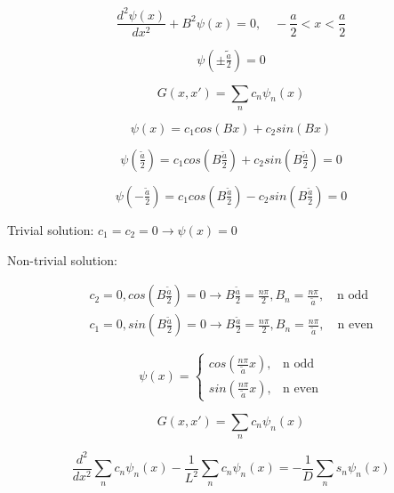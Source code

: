 \documentclass[12pt]{article}
\begin{document}
\begin{equation*}
\frac{d^2\psi(x)}{dx^2} + B^2\psi(x) = 0,\quad
-\frac{a}{2} < x < \frac{a}{2}
\end{equation*}

\begin{equation*}
\psi\left(\pm\tilde{\tfrac{a}{2}}\right) = 0
\end{equation*}

\begin{equation*}
G(x,x') = \sum_n c_n \psi_n(x)
\end{equation*}

\begin{equation*}
\psi(x) = c_1cos(Bx) + c_2sin(Bx)
\end{equation*}

\begin{equation*}
\psi(\tfrac{\tilde{a}}{2}) = c_1cos(B\tfrac{\tilde{a}}{2}) + c_2sin(B\tfrac{\tilde{a}}{2}) = 0
\end{equation*}

\begin{equation*}
\psi(-\tfrac{\tilde{a}}{2}) = c_1cos(B\tfrac{\tilde{a}}{2}) - c_2sin(B\tfrac{\tilde{a}}{2}) = 0
\end{equation*}

Trivial solution: $c_1 = c_2 = 0 \rightarrow \psi(x) = 0$


Non-trivial solution:

\begin{gather*}
c_2 = 0, cos(B\tfrac{\tilde{a}}{2}) = 0 \rightarrow B\frac{\tilde{a}}{2} = \frac{n\pi}{2}, B_n = \frac{n\pi}{\tilde{a}},\quad\text{n odd} \\
c_1 = 0, sin(B\tfrac{\tilde{a}}{2}) = 0 \rightarrow B\frac{\tilde{a}}{2} = \frac{n\pi}{2}, B_n = \frac{n\pi}{\tilde{a}},\quad\text{n even}
\end{gather*}

\begin{equation*}
  \psi(x)=\begin{cases}
    cos(\tfrac{n\pi}{\tilde{a}}x), & \text{n odd} \\
    sin(\tfrac{n\pi}{\tilde{a}}x), & \text{n even}
  \end{cases}
\end{equation*}

\begin{equation*}
G(x,x') = \sum_n c_n \psi_n(x)
\end{equation*}

\begin{equation*}
\frac{d^2}{dx^2}\sum_n c_n \psi_n(x) - \frac{1}{L^2}\sum_n c_n \psi_n(x)=-\frac{1}{D}\sum_n s_n \psi_n(x)
\end{equation*}
\end{document}
